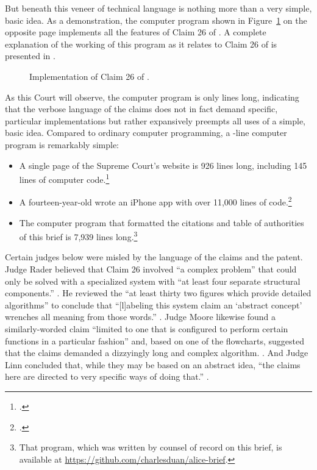 \documentclass{scotus}
\begin{document}
But beneath this veneer
of technical language is nothing more than a very simple, basic idea. As a
demonstration, the computer program shown in Figure~\ref{code-listing}
on the opposite page
implements all the features of Claim 26 of .
A complete explanation of the working of
this program as it relates to Claim 26 of  is presented in
.

\def\floatpagefraction{.1}
\begin{figure}[p]
\inlinebox{\wholeprogram}%
\baselineskip
\caption{Implementation of Claim 26 of \protect{}.}
\label{code-listing}
\end{figure}

As this Court will observe, the computer program is only \numlines lines long,
indicating that
the verbose language of the claims does not in fact demand specific, particular
implementations but rather expansively preempts all uses of a simple, basic
idea. Compared to ordinary computer programming, a \numlines-line computer
program is remarkably simple:
\begin{itemize}
\item A single page of the Supreme Court's website is 926 lines long, including
145 lines of computer code.\footnote{.}
\item A fourteen-year-old wrote an iPhone app with over 11,000 lines of
code.\footnote{.}
\item The computer program that formatted the citations
and table of authorities of this brief is 7,939 lines long.\footnote{That
program, which was written by counsel of record on this brief, is available at
\url{https://github.com/charlesduan/alice-brief}.}
\end{itemize}

Certain
judges below were misled by the language of the
claims and the patent.
Judge Rader believed that Claim 26 involved
``a complex problem'' that could only be solved with a specialized system
with ``at least four separate structural components.'' . He reviewed the ``at least thirty two figures
which
provide detailed algorithms'' to conclude that ``[l]abeling
this system claim an `abstract concept' wrenches all meaning from those words.''
. Judge Moore likewise found a
similarly-worded claim ``limited to one that is configured to perform certain
functions in a particular fashion'' and, based on one of the
flowcharts, suggested that the claims demanded a dizzyingly long
and complex algorithm. . And Judge Linn
concluded that, while they may be based
on an abstract idea, ``the claims here are directed to very specific ways of
doing that.''
.
\end{document}

